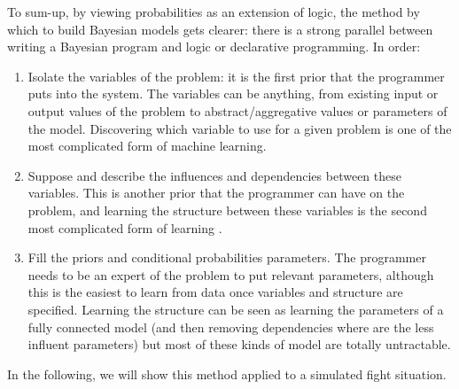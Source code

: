 To sum-up, by viewing probabilities as an extension of logic, the method by which to build Bayesian models gets clearer: there is a strong parallel between writing a Bayesian program and logic or declarative programming. In order:
\begin{enumerate}
    \item Isolate the variables of the problem: it is the first prior that the programmer puts into the system. The variables can be anything, from existing input or output values of the problem to abstract/aggregative values or parameters of the model. Discovering which variable to use for a given problem is one of the most complicated form of machine learning.
    \item Suppose and describe the influences and dependencies between these variables. This is another prior that the programmer can have on the problem, and learning the structure between these variables is the second most complicated form of learning \citep{Fra04b,Ler05a}.
    \item Fill the priors and conditional probabilities parameters. The programmer needs to be an expert of the problem to put relevant parameters, although this is the easiest to learn from data once variables and structure are specified. Learning the structure can be seen as learning the parameters of a fully connected model (and then removing dependencies where are the less influent parameters) but most of these kinds of model are totally untractable.
\end{enumerate}
In the following, we will show this method applied to a simulated  fight situation.



